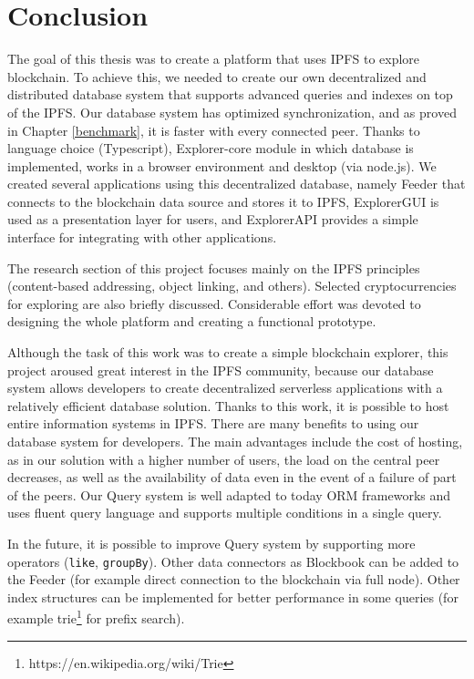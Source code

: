 \chapter{Conclusion}
\label{Conclusion}
The goal of this thesis was to create a platform that uses IPFS to explore blockchain. To achieve this, we needed to create our own decentralized and distributed database system that supports advanced queries and indexes on top of the IPFS. Our database system has optimized synchronization, and as proved in Chapter \ref{benchmark}, it is faster with every connected peer. Thanks to language choice (Typescript), Explorer-core module in which database is implemented, works in a browser environment and desktop (via node.js). We created several applications using this decentralized database, namely Feeder that connects to the blockchain data source and stores it to IPFS, ExplorerGUI is used as a presentation layer for users, and ExplorerAPI provides a simple interface for integrating with other applications.

The research section of this project focuses mainly on the IPFS principles (content-based addressing, object linking, and others). Selected cryptocurrencies for exploring are also briefly discussed. Considerable effort was devoted to designing the whole platform and creating a functional prototype.

Although the task of this work was to create a simple blockchain explorer, this project aroused great interest in the IPFS community, because our database system allows developers to create decentralized serverless applications with a relatively efficient database solution. Thanks to this work, it is possible to host entire information systems in IPFS. There are many benefits to using our database system for developers. The main advantages include the cost of hosting, as in our solution with a higher number of users, the load on the central peer decreases, as well as the availability of data even in the event of a failure of part of the peers. Our Query system is well adapted to today ORM frameworks and uses fluent query language and supports multiple conditions in a single query. 

In the future, it is possible to improve Query system by supporting more operators (\texttt{like}, \texttt{groupBy}). Other data connectors as Blockbook can be added to the Feeder (for example direct connection to the blockchain via full node). Other index structures can be implemented for better performance in some queries (for example trie\footnote{https://en.wikipedia.org/wiki/Trie} for prefix search).



 